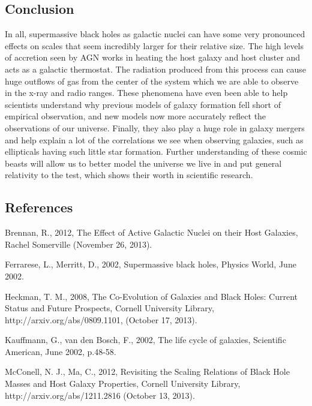\documentclass[12pt]{article}
\begin{document}
\subsection{Conclusion}
In all, supermassive black holes as galactic nuclei can have some very
pronounced effects on scales that seem incredibly larger for their relative
size.  The high levels of accretion seen by AGN works in heating the host galaxy
and host cluster and acts as a galactic thermostat.  The radiation produced from
this process can cause huge outflows of gas from the center of the system which
we are able to observe in the x-ray and radio ranges.  These phenomena have even
been able to help scientists understand why previous models of galaxy formation
fell short of empirical observation, and new models now more accurately reflect
the observations of our universe.  Finally, they also play a huge role in galaxy
mergers and help explain a lot of the correlations we see when observing
galaxies, such as ellipticals having such little star formation.  Further
understanding of these cosmic beasts will allow us to better model the universe
we live in and put general relativity to the test, which shows their worth in
scientific research.

\pagebreak
\subsection{References}

\begin{hangparas}{.25in}{1}

Brennan, R., 2012, The Effect of Active Galactic Nuclei on their Host Galaxies,
Rachel Somerville (November 26, 2013).

Ferrarese, L., Merritt, D., 2002, Supermassive black holes, Physics World, June
2002.

\vspace{5mm}

Heckman, T. M., 2008, The Co-Evolution of Galaxies and Black Holes: Current
Status and Future Prospects, Cornell University Library,
http://arxiv.org/abs/0809.1101, (October 17, 2013).

\vspace{5mm}

Kauffmann, G., van den Bosch, F., 2002, The life cycle of galaxies, Scientific
American, June 2002, p.48-58.

\vspace{5mm}

McConell, N. J., Ma, C., 2012, Revisiting the Scaling Relations of Black Hole
Masses and Host Galaxy Properties, Cornell University Library,
http://arxiv.org/abs/1211.2816 (October 13, 2013).

\vspace{5mm}

\end{hangparas}
\end{document}
